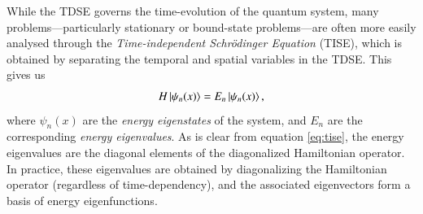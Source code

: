 \documentclass{subfiles}
\begin{document}
While the TDSE governs the time-evolution of the quantum system, many problems—particularly stationary or bound-state problems—are often more easily analysed through the \emph{Time-independent Schrödinger Equation} (TISE), which is obtained by separating the temporal and spatial variables in the TDSE. This gives us
\begin{equation}
    H\ket{\psi_n(x)} = E_n\ket{\psi_n(x)}\label{eq:tise},
\end{equation}
where $\psi_n(x)$ are the \emph{energy eigenstates} of the system, and $E_n$ are the corresponding \emph{energy eigenvalues}. As is clear from equation \eqref{eq:tise}, the energy eigenvalues are the diagonal elements of the diagonalized Hamiltonian operator. In practice, these eigenvalues are obtained by diagonalizing the Hamiltonian operator (regardless of time-dependency), and the associated eigenvectors form a basis of energy eigenfunctions. \\
\end{document}
